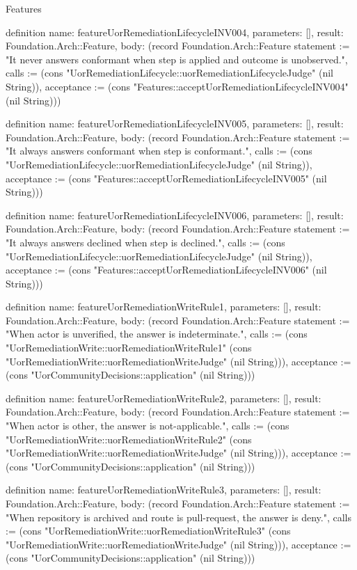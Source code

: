 \begin{lexlean}{Features}
\begin{semanticmodule}
definition{
  name: featureUorRemediationLifecycleINV004,
  parameters: [],
  result: Foundation.Arch::Feature,
  body: (record Foundation.Arch::Feature {statement := "It never answers conformant when step is applied and outcome is unobserved.", calls := (cons "UorRemediationLifecycle::uorRemediationLifecycleJudge" (nil String)), acceptance := (cons "Features::acceptUorRemediationLifecycleINV004" (nil String))})
}

definition{
  name: featureUorRemediationLifecycleINV005,
  parameters: [],
  result: Foundation.Arch::Feature,
  body: (record Foundation.Arch::Feature {statement := "It always answers conformant when step is conformant.", calls := (cons "UorRemediationLifecycle::uorRemediationLifecycleJudge" (nil String)), acceptance := (cons "Features::acceptUorRemediationLifecycleINV005" (nil String))})
}

definition{
  name: featureUorRemediationLifecycleINV006,
  parameters: [],
  result: Foundation.Arch::Feature,
  body: (record Foundation.Arch::Feature {statement := "It always answers declined when step is declined.", calls := (cons "UorRemediationLifecycle::uorRemediationLifecycleJudge" (nil String)), acceptance := (cons "Features::acceptUorRemediationLifecycleINV006" (nil String))})
}

definition{
  name: featureUorRemediationWriteRule1,
  parameters: [],
  result: Foundation.Arch::Feature,
  body: (record Foundation.Arch::Feature {statement := "When actor is unverified, the answer is indeterminate.", calls := (cons "UorRemediationWrite::uorRemediationWriteRule1" (cons "UorRemediationWrite::uorRemediationWriteJudge" (nil String))), acceptance := (cons "UorCommunityDecisions::application" (nil String))})
}

definition{
  name: featureUorRemediationWriteRule2,
  parameters: [],
  result: Foundation.Arch::Feature,
  body: (record Foundation.Arch::Feature {statement := "When actor is other, the answer is not-applicable.", calls := (cons "UorRemediationWrite::uorRemediationWriteRule2" (cons "UorRemediationWrite::uorRemediationWriteJudge" (nil String))), acceptance := (cons "UorCommunityDecisions::application" (nil String))})
}

definition{
  name: featureUorRemediationWriteRule3,
  parameters: [],
  result: Foundation.Arch::Feature,
  body: (record Foundation.Arch::Feature {statement := "When repository is archived and route is pull-request, the answer is deny.", calls := (cons "UorRemediationWrite::uorRemediationWriteRule3" (cons "UorRemediationWrite::uorRemediationWriteJudge" (nil String))), acceptance := (cons "UorCommunityDecisions::application" (nil String))})
}


\end{semanticmodule}
\end{lexlean}
